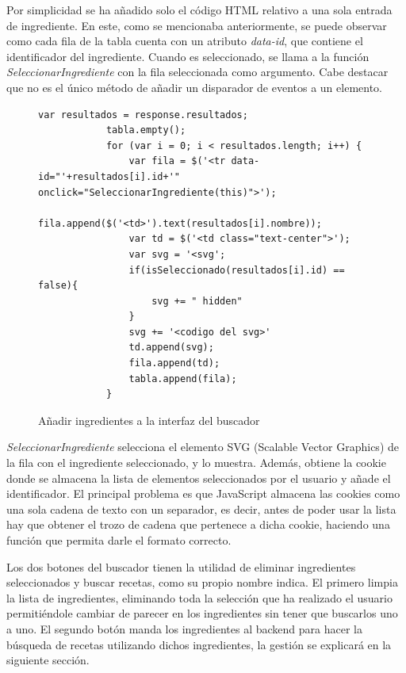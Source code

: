 Por simplicidad se ha añadido solo el código \gls{HTML} relativo a una sola entrada de ingrediente. En este, como se mencionaba anteriormente, se puede observar como cada fila de la tabla cuenta con un atributo \textit{data-id}, que contiene el identificador del ingrediente. Cuando es seleccionado, se llama a la función \textit{SeleccionarIngrediente} con la fila seleccionada como argumento. Cabe destacar que no es el único método de añadir un disparador de eventos a un elemento. 

\begin{figure}[H]
    \begin{lstlisting}[style=consola]
         var resultados = response.resultados;
            tabla.empty();
            for (var i = 0; i < resultados.length; i++) {
                var fila = $('<tr data-id="'+resultados[i].id+'" onclick="SeleccionarIngrediente(this)">');
                fila.append($('<td>').text(resultados[i].nombre));
                var td = $('<td class="text-center">');
                var svg = '<svg';
                if(isSeleccionado(resultados[i].id) == false){
                    svg += " hidden"
                }
                svg += '<codigo del svg>'
                td.append(svg);
                fila.append(td);
                tabla.append(fila);
            }
\end{lstlisting}
\caption{Añadir ingredientes a la interfaz del buscador}
\label{sni:JSBuscar}
\end{figure}

\textit{SeleccionarIngrediente} selecciona el elemento \gls{SVG} (Scalable Vector Graphics) de la fila con el ingrediente seleccionado, y lo muestra. Además, obtiene la \gls{cookie} donde se almacena la lista de elementos seleccionados por el usuario y añade el identificador. El principal problema es que JavaScript almacena las \glspl{cookie} como una sola cadena de texto con un separador, es decir, antes de poder usar la lista hay que obtener el trozo de cadena que pertenece a dicha \gls{cookie}, haciendo una función que permita darle el formato correcto.

Los dos botones del buscador tienen la utilidad de eliminar ingredientes seleccionados y buscar recetas, como su propio nombre indica. El primero limpia la lista de ingredientes, eliminando toda la selección que ha realizado el usuario permitiéndole cambiar de parecer en los ingredientes sin tener que buscarlos uno a uno. El segundo botón manda los ingredientes al \gls{backend} para hacer la búsqueda de recetas utilizando dichos ingredientes, la gestión se explicará en la siguiente sección.

